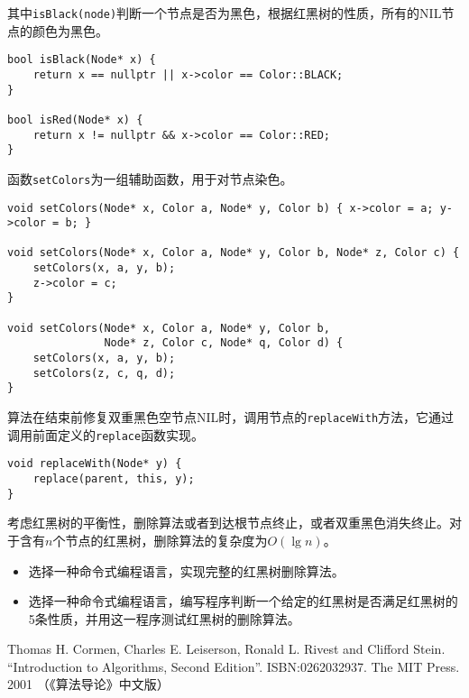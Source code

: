 \documentclass{ctexart}
\begin{document}
其中\texttt{isBlack(node)}判断一个节点是否为黑色，根据红黑树的性质，所有的NIL节点的颜色为黑色。

\begin{lstlisting}
bool isBlack(Node* x) {
    return x == nullptr || x->color == Color::BLACK;
}

bool isRed(Node* x) {
    return x != nullptr && x->color == Color::RED;
}
\end{lstlisting}

函数\texttt{setColors}为一组辅助函数，用于对节点染色。

\begin{lstlisting}
void setColors(Node* x, Color a, Node* y, Color b) { x->color = a; y->color = b; }

void setColors(Node* x, Color a, Node* y, Color b, Node* z, Color c) {
    setColors(x, a, y, b);
    z->color = c;
}

void setColors(Node* x, Color a, Node* y, Color b,
               Node* z, Color c, Node* q, Color d) {
    setColors(x, a, y, b);
    setColors(z, c, q, d);
}
\end{lstlisting}

算法在结束前修复双重黑色空节点NIL时，调用节点的\texttt{replaceWith}方法，它通过调用前面定义的\texttt{replace}函数实现。

\begin{lstlisting}
void replaceWith(Node* y) {
    replace(parent, this, y);
}
\end{lstlisting}

考虑红黑树的平衡性，删除算法或者到达根节点终止，或者双重黑色消失终止。对于含有$n$个节点的红黑树，删除算法的复杂度为$O(\lg n)$。

\begin{Exercise}

\begin{itemize}
\item 选择一种命令式编程语言，实现完整的红黑树删除算法。
\item 选择一种命令式编程语言，编写程序判断一个给定的红黑树是否满足红黑树的5条性质，并用这一程序测试红黑树的删除算法。
\end{itemize}

\end{Exercise}

\ifx\wholebook\relax \else
\begin{thebibliography}{99}

Thomas H. Cormen, Charles E. Leiserson, Ronald L. Rivest and Clifford Stein.
``Introduction to Algorithms, Second Edition''. ISBN:0262032937. The MIT Press. 2001 （《算法导论》中文版）

\end{thebibliography}
\end{document}
